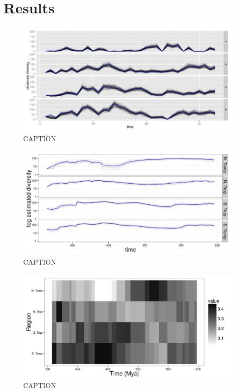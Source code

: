 \documentclass[12pt,letterpaper]{article}
\begin{document}
\section{Results}

\begin{figure}[ht]
  \centering
  \includegraphics[width=\textwidth,height=0.5\textheight,keepaspectratio=true]{figure/obs_div}
  \caption{CAPTION}
  \label{fig:fit}
\end{figure}

\begin{figure}[ht]
  \centering
  \includegraphics[width=\textwidth,height=0.5\textheight,keepaspectratio=true]{figure/true_div}
  \caption{CAPTION}
  \label{fig:true}
\end{figure}

\begin{figure}[ht]
  \centering
  \includegraphics[width=\textwidth,height=0.5\textheight,keepaspectratio=true]{figure/rel_div}
  \caption{CAPTION}
  \label{fig:rel}
\end{figure}
\end{document}
